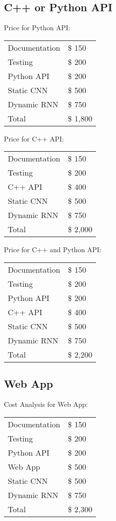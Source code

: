 \documentclass[dvips,12pt]{article}
\begin{document}
\subsection{C++ or Python API}

Price for Python API:
\begin{center}
\begin{tabular}{ll}
Documentation & \$ 150  \\
Testing       & \$ 200  \\
Python API & \$ 200 \\
Static CNN        & \$ 500  \\
Dynamic RNN      & \$ 750  \\
\hline
Total         & \$ 1,800
\end{tabular}
\end{center}
Price for C++ API:

\begin{center}
\begin{tabular}{ll}
Documentation & \$ 150  \\
Testing       & \$ 200  \\
C++ API & \$ 400 \\
Static CNN        & \$ 500  \\
Dynamic RNN      & \$ 750  \\
\hline
Total         & \$ 2,000
\end{tabular}
\end{center}
Price for C++ and Python API:

\begin{center}
\begin{tabular}{ll}
Documentation & \$ 150  \\
Testing       & \$ 200  \\
Python API & \$ 200 \\
C++ API & \$ 400 \\
Static CNN        & \$ 500  \\
Dynamic RNN      & \$ 750  \\
\hline
Total         & \$ 2,200
\end{tabular}
\end{center}


\subsection{Web App}
Cost Analysis for Web App:
\begin{center}
\begin{tabular}{ll}
Documentation & \$ 150  \\
Testing       & \$ 200  \\
Python API & \$ 200 \\
Web App & \$ 500 \\
Static CNN        & \$ 500  \\
Dynamic RNN      & \$ 750  \\
\hline
Total         & \$ 2,300
\end{tabular}
\end{center}
\end{document}
